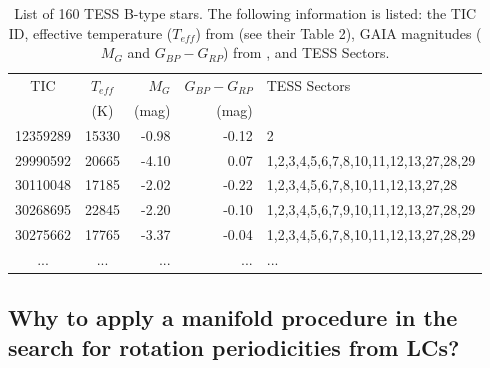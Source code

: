 \documentclass[RNAAS]{aastex63}
\begin{document}
\begin{table}[h]
   \centering
   \caption{\label{TABLE 1} List of 160 TESS B-type stars. The following information is listed: the TIC ID, effective temperature ($T_{eff}$) from \citet{Balona2019} (see their Table 2), GAIA magnitudes ($M_{G}$ and $G_{BP}-G_{RP}$) from \citet{Pedersen2019}, and TESS Sectors.}
    \begin{tabular}{ccrrl}
        \hline \hline
TIC       &  $T_{eff}$  & $M_{G}$ & $G_{BP}-G_{RP}$ &   TESS Sectors  \\
  & (K) & (mag) & (mag)   &    \\
\hline                
12359289	&	15330	&	-0.98	&	-0.12	&	 2\\
29990592	&	20665	&	-4.10	&	0.07	&	 1,2,3,4,5,6,7,8,10,11,12,13,27,28,29\\
30110048	&	17185	&	-2.02	&	-0.22	&	 1,2,3,4,5,6,7,8,10,11,12,13,27,28\\
30268695	&	22845	&	-2.20	&	-0.10	&	 1,2,3,4,5,6,7,9,10,11,12,13,27,28,29\\
30275662	&	17765	&	-3.37	&	-0.04	&	 1,2,3,4,5,6,7,8,10,11,12,13,27,28,29\\
...	&	...	&	...	&	...	&	 ...\\
\hline \hline                                              
    \end{tabular}
\end{table}

\subsection{Why to apply a manifold procedure in the search for rotation periodicities from LCs? } \label{subsec:Analysis}
\end{document}
